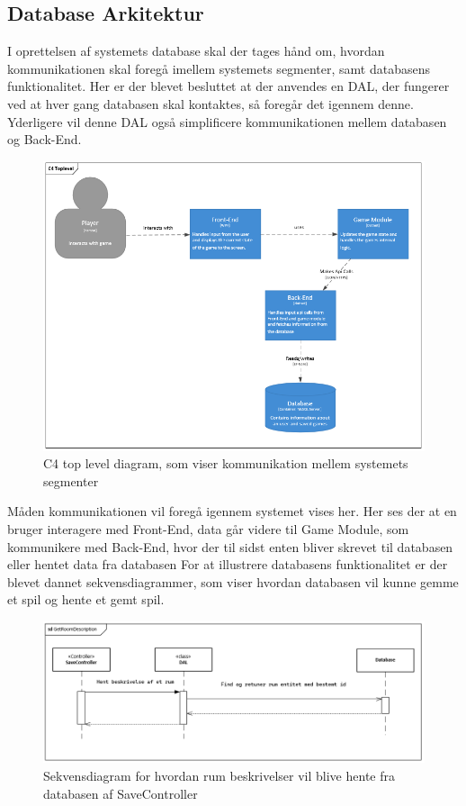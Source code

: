 \subsection{Database Arkitektur}

I oprettelsen af systemets database skal der tages hånd om, hvordan kommunikationen skal foregå imellem systemets segmenter, samt databasens funktionalitet. Her er der blevet besluttet at der anvendes en DAL, der fungerer ved at hver gang databasen skal kontaktes, så foregår det igennem denne. Yderligere vil denne DAL også simplificere kommunikationen mellem databasen og Back-End.

\begin{figure}[H]
\centering
\includegraphics[width = \textwidth]{02-Body/Images/C4TopLvlDB}
\caption{C4 top level diagram, som viser kommunikation mellem systemets segmenter}
\label{fig:C4TopLvlDB}
\end{figure}

Måden kommunikationen vil foregå igennem systemet vises her. Her ses der at en bruger interagere med Front-End, data går videre til Game Module, som kommunikere med Back-End, hvor der til sidst enten bliver skrevet til databasen eller hentet data fra databasen
For at illustrere databasens funktionalitet er der blevet dannet sekvensdiagrammer, som viser hvordan databasen vil kunne gemme et spil og hente et gemt spil.

\begin{figure}[H]
\centering
\includegraphics[width = \textwidth]{02-Body/Images/RoomDescriptionsDB.PNG}
\caption{Sekvensdiagram for hvordan rum beskrivelser vil blive hente fra databasen af SaveController}
\label{fig:RoomDescriptionsDB}
\end{figure}

